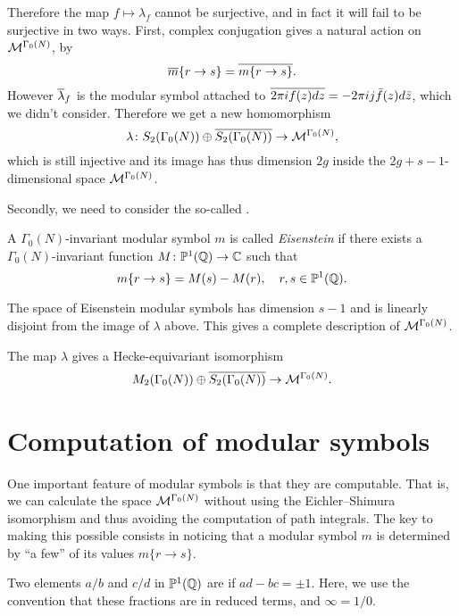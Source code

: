 Therefore the map $f\mapsto \lambda_f$ cannot be surjective, and in fact it will fail to be surjective in two ways. First, complex conjugation gives a natural action on $\mathcal{M}^{\Gamma_0(N)}$, by
\[
\overline{m}\{r\to s\} = \overline{m\{r\to s\}}.
\]
However $\overline{\lambda}_f$ is the modular symbol attached to $\overline{2\pi i f(z)dz} = -2\pi i j\bar f(z) d\bar z$, which we didn't consider. Therefore we get a new homomorphism
\[
\lambda\colon S_2(\Gamma_0(N))\oplus\overline{S_2(\Gamma_0(N))} \to \mathcal{M}^{\Gamma_0(N)},
\]
which is still injective and its image has thus dimension $2g$ inside the $2g+s-1$-dimensional space $\mathcal{M}^{\Gamma_0(N)}$.

Secondly, we need to consider the so-called .
\begin{definition}
  A $\Gamma_0(N)$-invariant modular symbol $m$ is called \emph{Eisenstein} if there exists a $\Gamma_0(N)$-invariant function $M\colon \mathbb{P}^1(\mathbb{Q})\to \mathbb{C}$ such that
\[
m\{r\to s\} = M(s)-M(r),\quad r,s\in \mathbb{P}^1(\mathbb{Q}).
\]
\end{definition}
The space of Eisenstein modular symbols has dimension $s-1$ and is linearly disjoint from the image of $\lambda$ above. This gives a complete description of $\mathcal{M}^{\Gamma_0(N)}$.
\begin{theorem}
  The map $\lambda$ gives a Hecke-equivariant isomorphism
\[
M_2(\Gamma_0(N))\oplus \overline{S_2(\Gamma_0(N))} \to \mathcal{M}^{\Gamma_0(N)}.
\]
\end{theorem}

\section{Computation of modular symbols}

One important feature of modular symbols is that they are computable. That is, we can calculate the space $\mathcal{M}^{\Gamma_0(N)}$ without using the Eichler--Shimura isomorphism and thus avoiding the computation of path integrals. The key to making this possible consists in noticing that a modular symbol $m$ is determined by ``a few'' of its values $m\{r\to s\}$.

\begin{definition}
  Two elements $a/b$ and $c/d$ in $\mathbb{P}^1(\mathbb{Q})$ are  if $ad-bc=\pm 1$. Here, we use the convention that these fractions are in reduced terms, and $\infty = 1/0$.
\end{definition}

